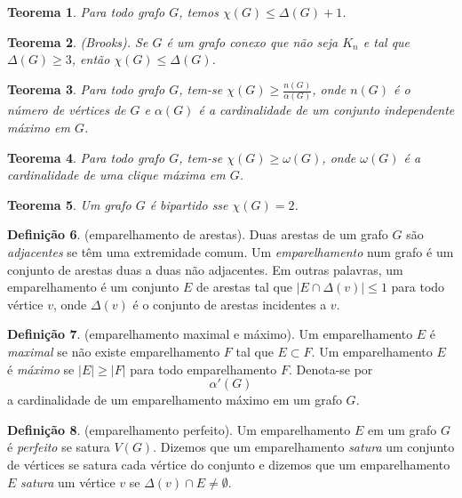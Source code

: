 \documentclass{article}
\theoremstyle{plain}
\newtheorem{thm}{Teorema}[section]
\theoremstyle{definition}
\newtheorem{defn}[thm]{Definição}
\theoremstyle{remark}
\begin{document}
\begin{thm}
    Para todo grafo \(G\), temos \(\chi(G) \leq \Delta(G) + 1\).
\end{thm}

\begin{thm} (Brooks).
    Se \(G\) é um grafo conexo que não seja \(K_n\) e tal que \(\Delta(G) \geq 3\), então \(\chi(G) \leq \Delta(G)\).
\end{thm}

\begin{thm}
    Para todo grafo \(G\), tem-se \(\chi(G) \geq \displaystyle \frac{n(G)}{\alpha(G)}\), onde \(n(G)\) é o número de vértices de \(G\) e \(\alpha(G)\) é a cardinalidade de um conjunto independente máximo em \(G\).
\end{thm}

\begin{thm}
    Para todo grafo \(G\), tem-se \(\chi(G) \geq \omega(G)\), onde \(\omega(G)\) é a cardinalidade de uma clique máxima em \(G\).
\end{thm}

\begin{thm}
    Um grafo \(G\) é bipartido sse \(\chi(G) = 2\).
\end{thm}

\begin{defn} (emparelhamento de arestas).
    Duas arestas de um grafo \(G\) são \emph{adjacentes} se têm uma extremidade comum. Um \emph{emparelhamento} num grafo é um conjunto de arestas duas a duas não adjacentes. Em outras palavras, um emparelhamento é um conjunto \(E\) de arestas tal que \(\vert E \cap \Delta(v) \vert \leq 1\) para todo vértice \(v\), onde \(\Delta(v)\) é o conjunto de arestas incidentes a \(v\).
\end{defn}

\begin{defn} (emparelhamento maximal e máximo).
    Um emparelhamento \(E\) é \emph{maximal} se não existe emparelhamento \(F\) tal que \(E \subset F\). Um emparelhamento \(E\) é \emph{máximo} se \(\vert E \vert \geq \vert F \vert\) para todo emparelhamento \(F\). Denota-se por
    \[
        \alpha'(G)
    \]
\noindent a cardinalidade de um emparelhamento máximo em um grafo \(G\).
\end{defn}

\begin{defn} (emparelhamento perfeito).
    Um emparelhamento \(E\) em um grafo \(G\) é \emph{perfeito} se satura \(V(G)\). Dizemos que um emparelhamento \emph{satura} um conjunto de vértices se satura cada vértice do conjunto e dizemos que um emparelhamento \(E\) \emph{satura} um vértice \(v\) se \(\Delta(v) \cap E \neq \emptyset\).
\end{defn}
\end{document}
